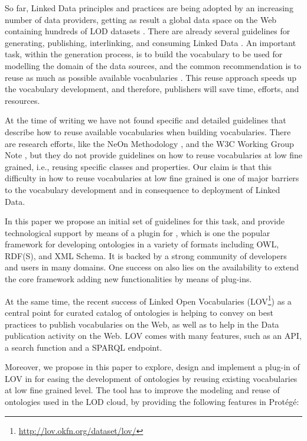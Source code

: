So far, Linked Data principles and practices are being adopted by an increasing number of data providers, getting as result a global data space on the Web containing hundreds of LOD datasets \cite{Heath_Bizer_2011}. There are already several guidelines for generating, publishing, interlinking, and consuming Linked Data \cite{}. An important task, within the generation process, is to build the vocabulary to be used for modelling the domain of the data sources, and the common recommendation is to reuse as much as possible available vocabularies \cite{}. This reuse approach speeds up the vocabulary development, and therefore, publishers will save time, efforts, and resources. 

At the time of writing we have not found specific and detailed guidelines that describe how to reuse available vocabularies when building vocabularies. There are research efforts, like the NeOn Methodology \cite{}, and the W3C Working Group Note \cite{}, but they do not provide guidelines on how to reuse vocabularies at low fine grained, i.e., reusing specific classes and properties. Our claim is that this difficulty in how to reuse vocabularies at low fine grained is one of major barriers to the vocabulary development and in consequence to deployment of Linked Data.

In this paper we propose an initial set of guidelines for this task, and provide technological support by means of a plugin for \protege, which is one the popular framework for developing ontologies in a variety of formats including OWL, RDF(S), and XML Schema. It is backed by a strong community of developers and users in many domains. One success on \protege also lies on the availability to extend the core framework adding new functionalities by means of plug-ins.

At the same time, the recent success of Linked Open Vocabularies (LOV\footnote{\url{http://lov.okfn.org/dataset/lov/}}) as a central point for curated catalog of ontologies is helping to convey on best practices to publish vocabularies on the Web, as well as to help in the Data publication activity on the Web. LOV comes with many features, such as an API, a search function and a SPARQL endpoint.
 
Moreover, we propose in this paper to explore, design and implement a plug-in of LOV in \protege for easing the development of ontologies by reusing existing vocabularies at low fine grained level. The tool has to improve the modeling and reuse of ontologies used in the LOD cloud, by providing the following features in Prot{\'e}g{\'e}:

